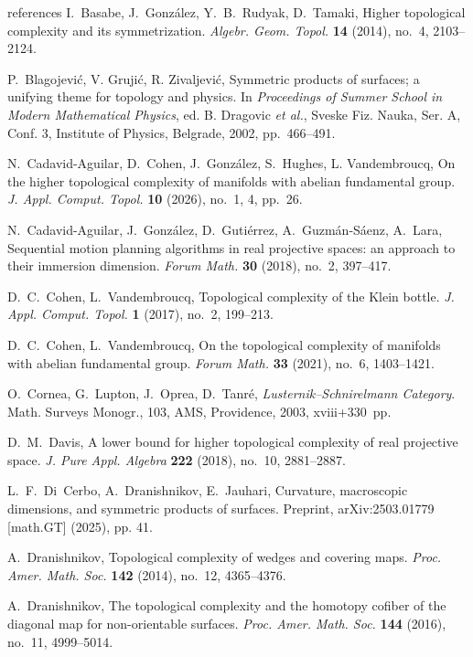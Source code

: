 \documentclass[amscd,amssymb,verbatim,10pt]{amsart}
\numberwithin{equation}{section}
\theoremstyle{plain}
\theoremstyle{definition}
\begin{document}
\begin{thebibliography}{references}
 I.~Basabe, J.~Gonz\'alez, Y.~B.~Rudyak, D.~Tamaki, Higher topological complexity and its symmetrization. \textit{Algebr. Geom. Topol.} \textbf{14} (2014), no.~4, 2103--2124.

 P.~Blagojevi\'c, V. Gruji\'c, R. Zivaljevi\'c, Symmetric products of surfaces; a unifying theme for topology and physics. In \emph{Proceedings of Summer School in Modern Mathematical Physics}, ed. B. Dragovic \emph{et al.}, Sveske Fiz. Nauka, Ser. A, Conf. 3, Institute of Physics, Belgrade, 2002, pp.~466--491.

 N.~Cadavid-Aguilar, D.~Cohen, J.~Gonz\'alez, S.~Hughes, L. Vandembroucq, On the higher topological complexity of manifolds with abelian fundamental group. \emph{J. Appl. Comput. Topol.} \textbf{10} (2026), no.~1, 4, pp.~26.

 N.~Cadavid-Aguilar, J.~Gonz\'alez, D.~Guti\'errez, A.~Guzm\'an-S\'aenz, A.~Lara, Sequential motion planning algorithms in real projective spaces: an approach to their immersion dimension. \emph{Forum Math.} \textbf{30} (2018), no.~2, 397--417.

 D.~C.~Cohen, L.~Vandembroucq, Topological complexity of the Klein bottle. \emph{J. Appl. Comput. Topol.} \textbf{1} (2017), no.~2, 199--213.

 D.~C.~Cohen, L.~Vandembroucq, On the topological complexity of manifolds with abelian fundamental group. \emph{Forum Math.} \textbf{33} (2021), no.~6, 1403--1421.

 O.~Cornea, G.~Lupton, J.~Oprea, D.~Tanr\'e, \emph{Lusternik--Schnirelmann Category}. Math. Surveys Monogr., 103, AMS, Providence, 2003, xviii+330~pp.

 D.~M.~Davis, A lower bound for higher topological complexity of real projective space. \emph{J. Pure Appl. Algebra} \textbf{222} (2018), no.~10, 2881--2887.

 L.~F.~Di~Cerbo, A.~Dranishnikov, E.~Jauhari, Curvature, macroscopic dimensions, and symmetric products of surfaces. Preprint, arXiv:2503.01779 [math.GT] (2025), pp. 41.

 A.~Dranishnikov, Topological complexity of wedges and covering maps. \emph{Proc. Amer. Math. Soc.} \textbf{142} (2014), no.~12, 4365--4376.

 A.~Dranishnikov, The topological complexity and the homotopy cofiber of the diagonal map for non-orientable surfaces. \emph{Proc. Amer. Math. Soc.} \textbf{144} (2016), no.~11, 4999--5014.


\end{thebibliography}
\end{document}
